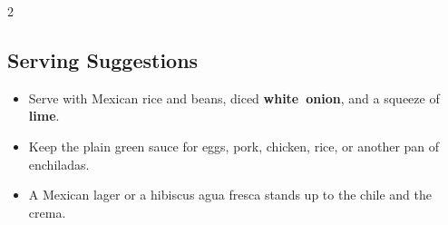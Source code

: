 \documentclass[11pt,letterpaper]{article}
\begin{document}
{\begin{multicols}{2}
\subsection*{Serving Suggestions}
\begin{itemize}
    \item Serve with Mexican rice and beans, diced \textbf{white~onion}, and a squeeze of \textbf{lime}.
    \item Keep the plain green sauce for eggs, pork, chicken, rice, or another pan of enchiladas.
    \item A Mexican lager or a hibiscus agua fresca stands up to the chile and the crema.
\end{itemize}

\end{multicols}
}
\end{document}
